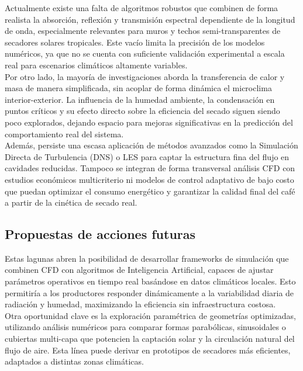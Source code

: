 \documentclass[12pt]{article}
\begin{document}
Actualmente existe una falta de algoritmos robustos que combinen de forma realista la absorción, reflexión y transmisión espectral dependiente de la longitud de onda, especialmente relevantes para muros y techos semi-transparentes de secadores solares tropicales. Este vacío limita la precisión de los modelos numéricos, ya que no se cuenta con suficiente validación experimental a escala real para escenarios climáticos altamente variables.\\

Por otro lado, la mayoría de investigaciones aborda la transferencia de calor y masa de manera simplificada, sin acoplar de forma dinámica el microclima interior-exterior. La influencia de la humedad ambiente, la condensación en puntos críticos y su efecto directo sobre la eficiencia del secado siguen siendo poco explorados, dejando espacio para mejoras significativas en la predicción del comportamiento real del sistema.\\

Además, persiste una escasa aplicación de métodos avanzados como la Simulación Directa de Turbulencia (DNS) o LES para captar la estructura fina del flujo en cavidades reducidas. Tampoco se integran de forma transversal análisis CFD con estudios económicos multicriterio ni modelos de control adaptativo de bajo costo que puedan optimizar el consumo energético y garantizar la calidad final del café a partir de la cinética de secado real.


\subsection{Propuestas de acciones futuras}

Estas lagunas abren la posibilidad de desarrollar frameworks de simulación que combinen CFD con algoritmos de Inteligencia Artificial, capaces de ajustar parámetros operativos en tiempo real basándose en datos climáticos locales. Esto permitiría a los productores responder dinámicamente a la variabilidad diaria de radiación y humedad, maximizando la eficiencia sin infraestructura costosa.\\

Otra oportunidad clave es la exploración paramétrica de geometrías optimizadas, utilizando análisis numéricos para comparar formas parabólicas, sinusoidales o cubiertas multi-capa que potencien la captación solar y la circulación natural del flujo de aire. Esta línea puede derivar en prototipos de secadores más eficientes, adaptados a distintas zonas climáticas.\\
\end{document}
